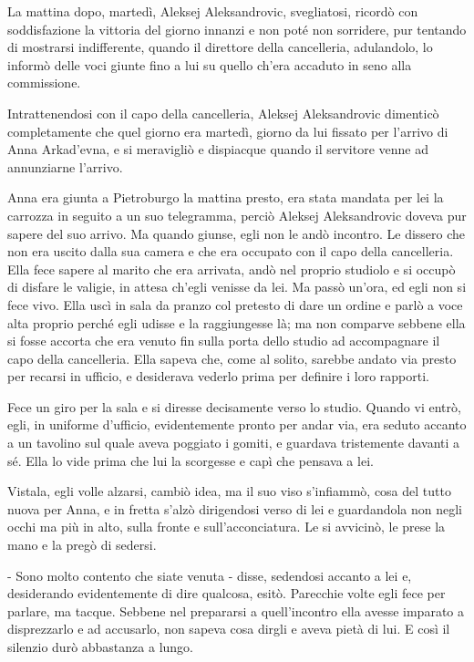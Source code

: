 La mattina dopo, martedì, Aleksej Aleksandrovic, svegliatosi, ricordò con soddisfazione la vittoria del giorno innanzi e non poté non sorridere, pur tentando di mostrarsi indifferente, quando il direttore della cancelleria, adulandolo, lo informò delle voci giunte fino a lui su quello ch'era accaduto in seno alla commissione. 

Intrattenendosi con il capo della cancelleria, Aleksej Aleksandrovic dimenticò completamente che quel giorno era martedì, giorno da lui fissato per l'arrivo di Anna Arkad'evna, e si meravigliò e dispiacque quando il servitore venne ad annunziarne l'arrivo. 

Anna era giunta a Pietroburgo la mattina presto, era stata mandata per lei la carrozza in seguito a un suo telegramma, perciò Aleksej Aleksandrovic doveva pur sapere del suo arrivo. Ma quando giunse, egli non le andò incontro. Le dissero che non era uscito dalla sua camera e che era occupato con il capo della cancelleria. Ella fece sapere al marito che era arrivata, andò nel proprio studiolo e si occupò di disfare le valigie, in attesa ch'egli venisse da lei. Ma passò un'ora, ed egli non si fece vivo. Ella uscì in sala da pranzo col pretesto di dare un ordine e parlò a voce alta proprio perché egli udisse e la raggiungesse là; ma non comparve sebbene ella si fosse accorta che era venuto fin sulla porta dello studio ad accompagnare il capo della cancelleria. Ella sapeva che, come al solito, sarebbe andato via presto per recarsi in ufficio, e desiderava vederlo prima per definire i loro rapporti. 

Fece un giro per la sala e si diresse decisamente verso lo studio. Quando vi entrò, egli, in uniforme d'ufficio, evidentemente pronto per andar via, era seduto accanto a un tavolino sul quale aveva poggiato i gomiti, e guardava tristemente davanti a sé. Ella lo vide prima che lui la scorgesse e capì che pensava a lei. 

Vistala, egli volle alzarsi, cambiò idea, ma il suo viso s'infiammò, cosa del tutto nuova per Anna, e in fretta s'alzò dirigendosi verso di lei e guardandola non negli occhi ma più in alto, sulla fronte e sull'acconciatura. Le si avvicinò, le prese la mano e la pregò di sedersi. 

- Sono molto contento che siate venuta - disse, sedendosi accanto a lei e, desiderando evidentemente di dire qualcosa, esitò. Parecchie volte egli fece per parlare, ma tacque. Sebbene nel prepararsi a quell'incontro ella avesse imparato a disprezzarlo e ad accusarlo, non sapeva cosa dirgli e aveva pietà di lui. E così il silenzio durò abbastanza a lungo. 

